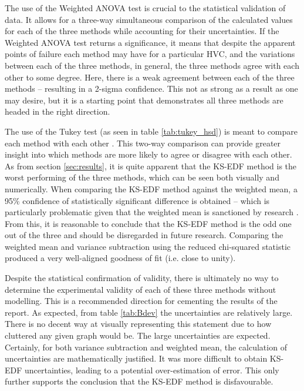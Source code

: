 The use of the Weighted ANOVA test is crucial to the statistical validation of data. It allows for a three-way simultaneous comparison of the calculated values for each of the three methods while accounting for their uncertainties. If the Weighted ANOVA test returns a significance, it means that despite the apparent points of failure each method may have for a particular HVC, and the variations between each of the three methods, in general, the three methods agree with each other to some degree. Here, there is a weak agreement between each of the three methods – resulting in a 2-sigma confidence. This not as strong as a result as one may desire, but it is a starting point that demonstrates all three methods are headed in the right direction.


The use of the Tukey test (as seen in table \ref{tab:tukey_hsd}) is meant to compare each method with each other \citep{ID77, ID78}. This two-way comparison can provide greater insight into which methods are more likely to agree or disagree with each other. As from section \ref{sec:results}, it is quite apparent that the KS-EDF method is the worst performing of the three methods, which can be seen both visually and numerically. When comparing the KS-EDF method against the weighted mean, a 95\% confidence of statistically significant difference is obtained – which is particularly problematic given that the weighted mean is sanctioned by research \citep{ID5, ID26}. From this, it is reasonable to conclude that the KS-EDF method is the odd one out of the three and should be disregarded in future research. Comparing the weighted mean and variance subtraction using the reduced chi-squared statistic produced a very well-aligned goodness of fit (i.e. close to unity).


Despite the statistical confirmation of validity, there is ultimately no way to determine the experimental validity of each of these three methods without modelling. This is a recommended direction for cementing the results of the report. As expected, from table \ref{tab:Bdev} the uncertainties are relatively large. There is no decent way at visually representing this statement due to how cluttered any given graph would be. The large uncertainties are expected. Certainly, for both variance subtraction and weighted mean, the calculation of uncertainties are mathematically justified. It was more difficult to obtain KS-EDF uncertainties, leading to a potential over-estimation of error. This only further supports the conclusion that the KS-EDF method is disfavourable.


